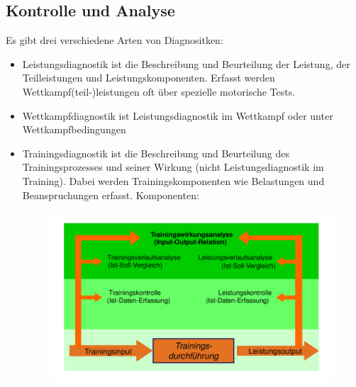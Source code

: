 \subsection{Kontrolle und Analyse}
Es gibt drei verschiedene Arten von Diagnositken:
\begin{itemize}
  \item Leistungsdiagnostik ist die Beschreibung und Beurteilung der Leistung, der Teilleistungen und Leistungskomponenten. Erfasst werden Wettkampf(teil-)leistungen oft über spezielle motorische Tests.
  \item Wettkampfdiagnostik ist Leistungsdiagnostik im Wettkampf oder unter Wettkampfbedingungen
  \item Trainingsdiagnostik ist die Beschreibung und Beurteilung des Trainingsprozesses und seiner Wirkung (nicht Leistungsdiagnostik im Training).
    Dabei werden Trainingskomponenten wie Belastungen und Beanspruchungen erfasst.
    Komponenten:\\
    \begin{figure}[H]
      \centering
      \includegraphics[width=.7\textwidth]{pictures/trainingssteuerung_trainingsdiagnostik_komponenten.png}
    \end{figure}
\end{itemize}

